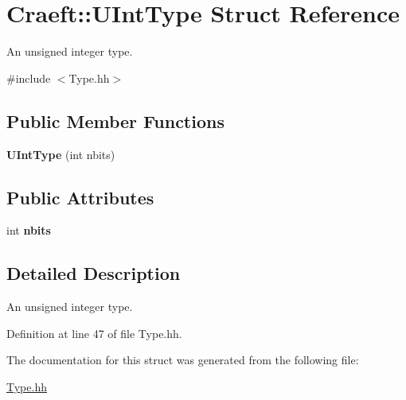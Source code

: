 \hypertarget{struct_craeft_1_1_u_int_type}{}\section{Craeft\+:\+:U\+Int\+Type Struct Reference}
\label{struct_craeft_1_1_u_int_type}


An unsigned integer type.  




{\ttfamily \#include $<$Type.\+hh$>$}

\subsection*{Public Member Functions}
\begin{DoxyCompactItemize}
\item 
\hypertarget{struct_craeft_1_1_u_int_type_a9e7db452453f5649ed76a0ca6898181d}{}\label{struct_craeft_1_1_u_int_type_a9e7db452453f5649ed76a0ca6898181d} 
{\bfseries U\+Int\+Type} (int nbits)
\end{DoxyCompactItemize}
\subsection*{Public Attributes}
\begin{DoxyCompactItemize}
\item 
\hypertarget{struct_craeft_1_1_u_int_type_aa7a8e31c6d8daf58e8894a9abea60599}{}\label{struct_craeft_1_1_u_int_type_aa7a8e31c6d8daf58e8894a9abea60599} 
int {\bfseries nbits}
\end{DoxyCompactItemize}


\subsection{Detailed Description}
An unsigned integer type. 

Definition at line 47 of file Type.\+hh.



The documentation for this struct was generated from the following file\+:\begin{DoxyCompactItemize}
\item 
\hyperlink{_type_8hh}{Type.\+hh}\end{DoxyCompactItemize}
